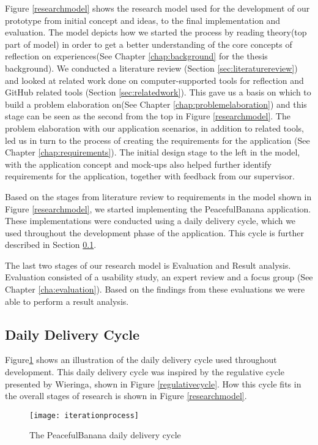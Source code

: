 Figure \ref{researchmodel} shows the research model used for the development of our prototype from initial concept and ideas, to the final implementation and evaluation. The model depicts how we started the process by reading theory(top part of model) in order to get a better understanding of the core concepts of reflection on experiences(See Chapter \ref{chap:background} for the thesis background).
\clearpage 
We conducted a literature review (Section \ref{sec:literaturereview}) and looked at related work done on computer-supported tools for reflection and GitHub related tools (Section \ref{sec:relatedwork}). This gave us a basis on which to build a problem elaboration on(See Chapter \ref{chap:problemelaboration}) and this stage can be seen as the second from the top in Figure \ref{researchmodel}. The problem elaboration with our application scenarios, in addition to related tools, led us in turn to the process of creating the requirements for the application (See Chapter \ref{chap:requirements}). The initial design stage to the left in the model, with the application concept and mock-ups also helped further identify requirements for the application, together with feedback from our supervisor. 

Based on the stages from literature review to requirements in the model shown in Figure \ref{researchmodel}, we started implementing the PeacefulBanana application. These implementations were conducted using a daily delivery cycle, which we used throughout the development phase of the application. This cycle is further described in Section \ref{sec:dailydeliverycycle}. 

The last two stages of our research model is Evaluation and Result analysis. Evaluation consisted of a usability study, an expert review and a focus group (See Chapter \ref{cha:evaluation}). Based on the findings from these evaluations we were able to perform a result analysis. 

\subsection{Daily Delivery Cycle}
\label{sec:dailydeliverycycle}
Figure\ref{iterationprocess} shows an illustration of the daily delivery cycle used throughout development. This daily delivery cycle was inspired by the regulative cycle presented by Wieringa\citep{wieringa}, shown in Figure \ref{regulativecycle}. How this cycle fits in the overall stages of research is shown in Figure \ref{researchmodel}.
\begin{figure}[!htpb]
\centering
	\texttt{[image: iterationprocess]}
\caption{The PeacefulBanana daily delivery cycle}
\label{iterationprocess}
\end{figure}

